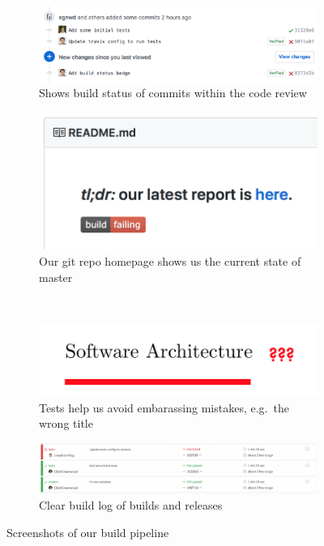 \begin{figure}[ht]
  \centering
  \begin{subfigure}[h]{0.4\linewidth}
    \centering
    \includegraphics[width=\linewidth]{ci-1.png}
    \caption{Shows build status of commits within the code review}
    \label{fig:ci-1}
  \end{subfigure}
  \hfill
  \begin{subfigure}[h]{0.4\linewidth}
    \centering
    \includegraphics[width=\linewidth]{ci-2.png}
    \caption{Our git repo homepage shows us the current state of master}
    \label{fig:ci-2}
  \end{subfigure}
  \\
  \begin{subfigure}[h]{0.4\linewidth}
    \centering
    \includegraphics[width=\linewidth]{ci-3.png}
    \caption{Tests help us avoid embarassing mistakes, e.g.~the wrong title}
    \label{fig:ci-3}
  \end{subfigure}
  \hfill
  \begin{subfigure}[h]{0.4\linewidth}
    \centering
    \includegraphics[width=\linewidth]{ci-4.png}
    \caption{Clear build log of builds and releases}
    \label{fig:ci-4}
  \end{subfigure}
  \caption{Screenshots of our build pipeline}
  \label{fig:}
\end{figure}
